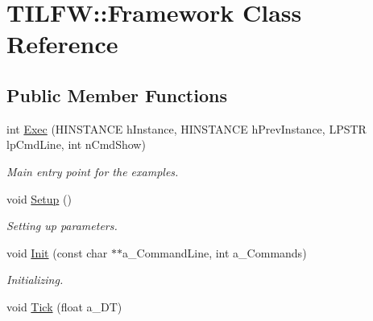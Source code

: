 \hypertarget{class_t_i_l_f_w_1_1_framework}{
\section{TILFW::Framework Class Reference}
\label{class_t_i_l_f_w_1_1_framework}
}
\subsection*{Public Member Functions}
\begin{DoxyCompactItemize}
\item 
\hypertarget{class_t_i_l_f_w_1_1_framework_ae741a615824b09b039531c1ecd0c4ebe}{
int \hyperlink{class_t_i_l_f_w_1_1_framework_ae741a615824b09b039531c1ecd0c4ebe}{Exec} (HINSTANCE hInstance, HINSTANCE hPrevInstance, LPSTR lpCmdLine, int nCmdShow)}
\label{class_t_i_l_f_w_1_1_framework_ae741a615824b09b039531c1ecd0c4ebe}

\begin{DoxyCompactList}\small\item\em Main entry point for the examples. \item\end{DoxyCompactList}\item 
void \hyperlink{class_t_i_l_f_w_1_1_framework_a2416aef2383b7d879a9c249b1a303641}{Setup} ()
\begin{DoxyCompactList}\small\item\em Setting up parameters. \item\end{DoxyCompactList}\item 
\hypertarget{class_t_i_l_f_w_1_1_framework_a35b3f67924bad5512ed4e279f1ad91aa}{
void \hyperlink{class_t_i_l_f_w_1_1_framework_a35b3f67924bad5512ed4e279f1ad91aa}{Init} (const char $\ast$$\ast$a\_\-CommandLine, int a\_\-Commands)}
\label{class_t_i_l_f_w_1_1_framework_a35b3f67924bad5512ed4e279f1ad91aa}

\begin{DoxyCompactList}\small\item\em Initializing. \item\end{DoxyCompactList}\item 
\hypertarget{class_t_i_l_f_w_1_1_framework_a42420a83c470902e957af36baddd53ee}{
void \hyperlink{class_t_i_l_f_w_1_1_framework_a42420a83c470902e957af36baddd53ee}{Tick} (float a\_\-DT)}
\label{class_t_i_l_f_w_1_1_framework_a42420a83c470902e957af36baddd53ee}


\end{DoxyCompactItemize}
